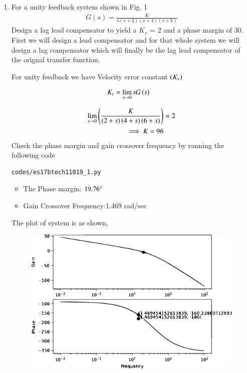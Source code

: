 \begin{enumerate}[label=\thesection.\arabic*.,ref=\thesection.\theenumi]

\item For a unity feedback system shown in Fig. 1
\begin{align}
G(s) =\frac{K}{s(s+2)(s+4)(s+6)}
\label{eq:es17btech11019_system1}
\end{align}
Design a lag lead compensator to yield a $K_v$ = 2 and a phase margin of 30\degree.
First we will design a lead compensator and for that whole system we will design a lag compensator which will finally be the lag lead compensator of the orignal transfer function.


\solution 
For unity feedback we have Velocity error constant $\left(K_v\right)$

\begin{align}
K_v &= \lim_{s \to 0} s G\left(s\right) 
\label{eq:es17btech11019_Kv}
\end{align}

\begin{align}
\lim_{s \to 0} \left(\frac{K}{\left(2+s\right)\left(4+s\right)\left(6+s\right)} \right)& = 2 
\\
\implies K = 96
\label{eq:es17btech11019_init_cond}
\end{align}
Check the phase margin and gain crossover frequency by running the following code
\begin{lstlisting}
codes/es17btech11019_1.py
\end{lstlisting}
\begin{itemize}
    \item The Phase margin: $19.76\degree$
    \item Gain Crossover Frequency:1.469  rad/sec
\end{itemize}
The plot of system is as shown,
\begin{figure}[!ht]
  \centering
  \includegraphics[width=\columnwidth]{./figs/es17btech11019_1.eps}
  \caption{}
  \label{fig:es17btech11019_1}
\end{figure}


\end{enumerate}
